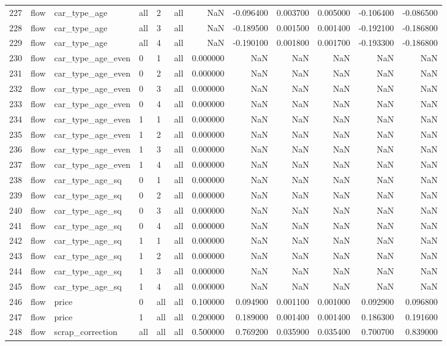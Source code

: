\begin{tabular}{llllllrrrrrr}
227 & flow & car_type_age & all & 2 & all & NaN & -0.096400 & 0.003700 & 0.005000 & -0.106400 & -0.086500 \\
228 & flow & car_type_age & all & 3 & all & NaN & -0.189500 & 0.001500 & 0.001400 & -0.192100 & -0.186800 \\
229 & flow & car_type_age & all & 4 & all & NaN & -0.190100 & 0.001800 & 0.001700 & -0.193300 & -0.186800 \\
230 & flow & car_type_age_even & 0 & 1 & all & 0.000000 & NaN & NaN & NaN & NaN & NaN \\
231 & flow & car_type_age_even & 0 & 2 & all & 0.000000 & NaN & NaN & NaN & NaN & NaN \\
232 & flow & car_type_age_even & 0 & 3 & all & 0.000000 & NaN & NaN & NaN & NaN & NaN \\
233 & flow & car_type_age_even & 0 & 4 & all & 0.000000 & NaN & NaN & NaN & NaN & NaN \\
234 & flow & car_type_age_even & 1 & 1 & all & 0.000000 & NaN & NaN & NaN & NaN & NaN \\
235 & flow & car_type_age_even & 1 & 2 & all & 0.000000 & NaN & NaN & NaN & NaN & NaN \\
236 & flow & car_type_age_even & 1 & 3 & all & 0.000000 & NaN & NaN & NaN & NaN & NaN \\
237 & flow & car_type_age_even & 1 & 4 & all & 0.000000 & NaN & NaN & NaN & NaN & NaN \\
238 & flow & car_type_age_sq & 0 & 1 & all & 0.000000 & NaN & NaN & NaN & NaN & NaN \\
239 & flow & car_type_age_sq & 0 & 2 & all & 0.000000 & NaN & NaN & NaN & NaN & NaN \\
240 & flow & car_type_age_sq & 0 & 3 & all & 0.000000 & NaN & NaN & NaN & NaN & NaN \\
241 & flow & car_type_age_sq & 0 & 4 & all & 0.000000 & NaN & NaN & NaN & NaN & NaN \\
242 & flow & car_type_age_sq & 1 & 1 & all & 0.000000 & NaN & NaN & NaN & NaN & NaN \\
243 & flow & car_type_age_sq & 1 & 2 & all & 0.000000 & NaN & NaN & NaN & NaN & NaN \\
244 & flow & car_type_age_sq & 1 & 3 & all & 0.000000 & NaN & NaN & NaN & NaN & NaN \\
245 & flow & car_type_age_sq & 1 & 4 & all & 0.000000 & NaN & NaN & NaN & NaN & NaN \\
246 & flow & price & 0 & all & all & 0.100000 & 0.094900 & 0.001100 & 0.001000 & 0.092900 & 0.096800 \\
247 & flow & price & 1 & all & all & 0.200000 & 0.189000 & 0.001400 & 0.001400 & 0.186300 & 0.191600 \\
248 & flow & scrap_correction & all & all & all & 0.500000 & 0.769200 & 0.035900 & 0.035400 & 0.700700 & 0.839000 \\
\bottomrule
\end{tabular}
